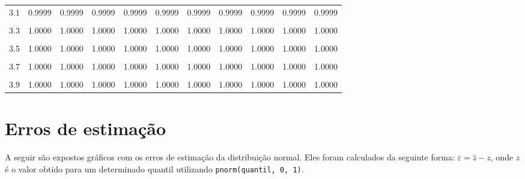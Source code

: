 \documentclass[
]{article}
\begin{document}
\begin{longtable}[l]{lcccccccccc}
3.1 & 0.9999 & 0.9999 & 0.9999 & 0.9999 & 0.9999 & 0.9999 & 0.9999 & 0.9999 & 0.9999 & 0.9999\\
\cellcolor{gray!15}{3.2} & \cellcolor{gray!15}{0.9999} & \cellcolor{gray!15}{0.9999} & \cellcolor{gray!15}{0.9999} & \cellcolor{gray!15}{0.9999} & \cellcolor{gray!15}{0.9999} & \cellcolor{gray!15}{0.9999} & \cellcolor{gray!15}{0.9999} & \cellcolor{gray!15}{0.9999} & \cellcolor{gray!15}{1.0000} & \cellcolor{gray!15}{1.0000}\\
3.3 & 1.0000 & 1.0000 & 1.0000 & 1.0000 & 1.0000 & 1.0000 & 1.0000 & 1.0000 & 1.0000 & 1.0000\\
\cellcolor{gray!15}{3.4} & \cellcolor{gray!15}{1.0000} & \cellcolor{gray!15}{1.0000} & \cellcolor{gray!15}{1.0000} & \cellcolor{gray!15}{1.0000} & \cellcolor{gray!15}{1.0000} & \cellcolor{gray!15}{1.0000} & \cellcolor{gray!15}{1.0000} & \cellcolor{gray!15}{1.0000} & \cellcolor{gray!15}{1.0000} & \cellcolor{gray!15}{1.0000}\\
3.5 & 1.0000 & 1.0000 & 1.0000 & 1.0000 & 1.0000 & 1.0000 & 1.0000 & 1.0000 & 1.0000 & 1.0000\\
\cellcolor{gray!15}{3.6} & \cellcolor{gray!15}{1.0000} & \cellcolor{gray!15}{1.0000} & \cellcolor{gray!15}{1.0000} & \cellcolor{gray!15}{1.0000} & \cellcolor{gray!15}{1.0000} & \cellcolor{gray!15}{1.0000} & \cellcolor{gray!15}{1.0000} & \cellcolor{gray!15}{1.0000} & \cellcolor{gray!15}{1.0000} & \cellcolor{gray!15}{1.0000}\\
3.7 & 1.0000 & 1.0000 & 1.0000 & 1.0000 & 1.0000 & 1.0000 & 1.0000 & 1.0000 & 1.0000 & 1.0000\\
\cellcolor{gray!15}{3.8} & \cellcolor{gray!15}{1.0000} & \cellcolor{gray!15}{1.0000} & \cellcolor{gray!15}{1.0000} & \cellcolor{gray!15}{1.0000} & \cellcolor{gray!15}{1.0000} & \cellcolor{gray!15}{1.0000} & \cellcolor{gray!15}{1.0000} & \cellcolor{gray!15}{1.0000} & \cellcolor{gray!15}{1.0000} & \cellcolor{gray!15}{1.0000}\\
3.9 & 1.0000 & 1.0000 & 1.0000 & 1.0000 & 1.0000 & 1.0000 & 1.0000 & 1.0000 & 1.0000 & 1.0000\\*
\end{longtable}

\hypertarget{erros-de-estimauxe7uxe3o}{%
\section{Erros de estimação}\label{erros-de-estimauxe7uxe3o}}

A seguir são expostos gráficos com os erros de estimação da distribuição
normal. Eles foram calculados da seguinte forma:
\(\varepsilon = \hat{z} - z\), onde \(z\) é o valor obtido para um
determinado quantil utilizando \texttt{pnorm(quantil,\ 0,\ 1)}.
\end{document}
